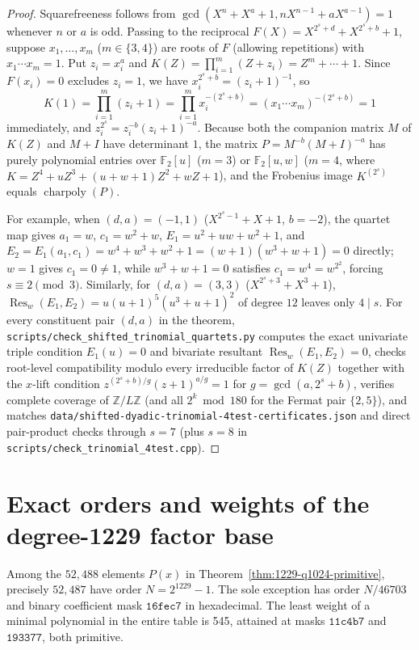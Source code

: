 \documentclass[11pt]{article}
\newcommand{\F}{\mathbb F_2}
\begin{document}
\begin{proof}
Squarefreeness follows from \(\gcd(X^n+X^a+1,nX^{n-1}+aX^{a-1})=1\) whenever
\(n\) or \(a\) is odd. Passing to the reciprocal
\(F(X)=X^{2^s+d}+X^{2^s+b}+1\), suppose \(x_1,\ldots,x_m\) (\(m\in\{3,4\}\))
are roots of \(F\) (allowing repetitions) with \(x_1\cdots x_m=1\). Put
\(z_i=x_i^a\) and \(K(Z)=\prod_{i=1}^m(Z+z_i)=Z^m+\cdots+1\). Since
\(F(x_i)=0\) excludes \(z_i=1\), we have \(x_i^{2^s+b}=(z_i+1)^{-1}\), so
\[
  K(1)=\prod_{i=1}^m(z_i+1)=\prod_{i=1}^m x_i^{-(2^s+b)}=(x_1\cdots x_m)^{-(2^s+b)}=1
\]
immediately, and \(z_i^{2^s}=z_i^{-b}(z_i+1)^{-a}\). Because both the companion
matrix \(M\) of \(K(Z)\) and \(M+I\) have determinant \(1\), the matrix
\(P=M^{-b}(M+I)^{-a}\) has purely polynomial entries over \(\F[u]\) (\(m=3\))
or \(\F[u,w]\) (\(m=4\), where \(K=Z^4+uZ^3+(u+w+1)Z^2+wZ+1\)), and the
Frobenius image \(K^{(2^s)}\) equals \(\operatorname{charpoly}(P)\).

For example, when \((d,a)=(-1,1)\) (\(X^{2^s-1}+X+1\), \(b=-2\)), the quartet
map gives \(a_1=w\), \(c_1=w^2+w\), \(E_1=u^2+uw+w^2+1\), and
\(E_2=E_1(a_1,c_1)=w^4+w^3+w^2+1=(w+1)(w^3+w+1)=0\) directly; \(w=1\) gives
\(c_1=0\ne1\), while \(w^3+w+1=0\) satisfies \(c_1=w^4=w^{2^2}\), forcing
\(s\equiv2\pmod3\). Similarly, for \((d,a)=(3,3)\) (\(X^{2^s+3}+X^3+1\)),
\(\operatorname{Res}_w(E_1,E_2)=u(u+1)^5(u^3+u+1)^2\) of degree \(12\) leaves
only \(4\mid s\). For every constituent pair \((d,a)\) in the theorem,
\nolinkurl{scripts/check_shifted_trinomial_quartets.py} computes the exact
univariate triple condition \(E_1(u)=0\) and bivariate resultant
\(\operatorname{Res}_w(E_1,E_2)=0\), checks root-level compatibility modulo
every irreducible factor of \(K(Z)\) together with the \(x\)-lift condition
\(z^{(2^s+b)/g}(z+1)^{a/g}=1\) for \(g=\gcd(a,2^s+b)\), verifies complete
coverage of \(\mathbb Z/L\mathbb Z\) (and all \(2^k\bmod180\) for the Fermat
pair \(\{2,5\}\)), and matches \nolinkurl{data/shifted-dyadic-trinomial-4test-certificates.json}
and direct pair-product checks through \(s=7\) (plus \(s=8\) in
\nolinkurl{scripts/check_trinomial_4test.cpp}).
\end{proof}

\section{Exact orders and weights of the degree-1229 factor base}
\label{sec:q1024-factor-orders}
Among the \(52{,}488\) elements \(P(x)\) in
Theorem~\ref{thm:1229-q1024-primitive}, precisely \(52{,}487\) have
order \(N=2^{1229}-1\). The sole exception has order \(N/46703\) and
binary coefficient mask \(\mathtt{16fec7}\) in hexadecimal. The least
weight of a minimal polynomial in the entire table is 545, attained
at masks \(\mathtt{11c4b7}\) and \(\mathtt{193377}\), both primitive.
\end{document}
